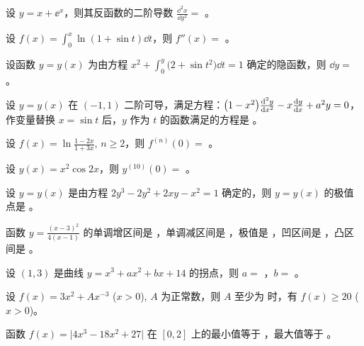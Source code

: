 \begin{ti}
	设 $y = x + \ee^x$，则其反函数的二阶导数 $\frac{\dd^2{x}}{\dd{y^2}} = $ \hua。
\end{ti}

\begin{ti}
	设 $f(x) = \int_0^x \ln(1 + \sin t) \dd{t}$，则 $f''(x) = $ \hua。
\end{ti}

\begin{ti}
	设函数 $y = y(x)$ 为由方程 $x^2 + \int_0^y \bigl( 2 + \sin t^2 \bigr) \dd{t} = 1$ 确定的隐函数，则 $\dd{y} = $ \hua。
\end{ti}

\begin{ti}
	设 $y = y(x)$ 在 $(-1,1)$ 二阶可导，满足方程：$\bigl(1 - x^2\bigr) \* \frac{\dd^2{y}}{\dd{x^2}} - x \* \frac{\dd{y}}{\dd{x}} + a^2 \* y = 0$，作变量替换 $x = \sin t$ 后，$y$ 作为 $t$ 的函数满足的方程是 \hua。
\end{ti}

\begin{ti}
	设 $f(x) = \ln \frac{1-2x}{1+3x}$, $n \geq 2$，则 $f^{(n)}(0) = $ \hua。
\end{ti}

\begin{ti}
	设 $y(x) = x^2 \cos 2x$，则 $y^{(10)}(0) = $ \hua。
\end{ti}

\begin{ti}
	设 $y = y(x)$ 是由方程 $2y^3 - 2y^2 + 2xy - x^2 = 1$ 确定的，则 $y = y(x)$ 的极值点是 \hua。
\end{ti}

\begin{ti}
	函数 $y = \frac{(x-3)^2}{4(x-1)}$ 的单调增区间是 \hua，单调减区间是 \hua，极值是 \hua，凹区间是 \hua，凸区间是 \hua。
\end{ti}

\begin{ti}
	设 $(1,3)$ 是曲线 $y = x^3 + ax^2 + bx + 14$ 的拐点，则 $a = $ \hua，$b = $ \hua。
\end{ti}

\begin{ti}
	设 $f(x) = 3x^2 + Ax^{-3}$ ($x > 0$), $A$ 为正常数，则 $A$ 至少为 \hua{} 时，有 $f(x) \geq 20$ ($x > 0$)。
\end{ti}

\begin{ti}
	函数 $f(x) = \bigl| 4x^3 - 18x^2 + 27 \bigr|$ 在 $[0,2]$ 上的最小值等于 \hua，最大值等于 \hua。
\end{ti}


